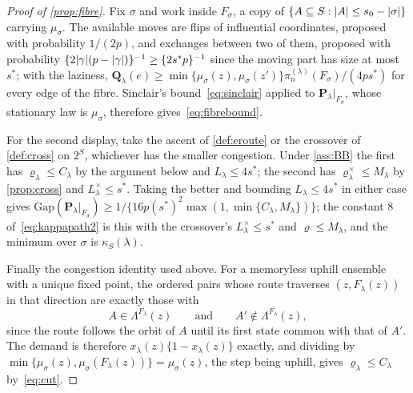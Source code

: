 \begin{proof}[Proof of \cref{prop:fibre}]
    Fix $\sigma$ and work inside $F_\sigma$, a copy of
    $\{A\subseteq S:\lvert A\rvert\leq s_0-\lvert\sigma\rvert\}$ carrying $\mu_\sigma$. The
    available moves are flips of influential coordinates, proposed with
    probability $1/(2p)$, and exchanges between two of them, proposed with
    probability $\{2\lvert\gamma\rvert(p-\lvert\gamma\rvert)\}^{-1}\geq\{2s^{\ast}p\}^{-1}$
    since the moving part has size at most $s^{\ast}$; with the laziness,
    $\mathbf{Q}_\lambda(e)\geq\min\{\mu_\sigma(z),\mu_\sigma(z')\}
    \pi_n^{(\lambda)}(F_\sigma)/(4ps^{\ast})$ for every edge of the fibre.
    Sinclair's bound~\eqref{eq:sinclair} applied to
    $\mathbf{P}_\lambda|_{F_\sigma}$, whose stationary law is $\mu_\sigma$,
    therefore gives~\eqref{eq:fibrebound}.

    For the second display, take the ascent of \cref{def:eroute} or the
    crossover of \cref{def:cross} on $2^{S}$, whichever has the smaller
    congestion. Under \cref{ass:BB} the first has
    $\varrho_\lambda\leq C_\lambda$ by the argument below and
    $L_\lambda\leq4s^{\ast}$; the second has
    $\varrho^{\times}_\lambda\leq M_\lambda$ by \cref{prop:cross} and
    $L^{\times}_\lambda\leq s^{\ast}$. Taking the better and bounding
    $L_\lambda\leq4s^{\ast}$ in either case gives
    $\mathrm{Gap}(\mathbf{P}_\lambda|_{F_\sigma})\geq1/\{16p(s^{\ast})^{2}
    \max(1,\min\{C_\lambda,M_\lambda\})\}$; the constant $8$
    of~\eqref{eq:kappapath2} is this with the crossover's
    $L^{\times}_\lambda\leq s^{\ast}$ and $\varrho\leq M_\lambda$, and the
    minimum over $\sigma$ is $\kappa_S(\lambda)$.

    Finally the congestion identity used above. For a memoryless uphill
    ensemble with a unique fixed point, the ordered pairs whose route
    traverses $(z,F_\lambda(z))$ in that direction are exactly those with
    \begin{equation}
        \label{eq:cutpairs}
        A\in\Lambda^{F_\lambda}(z)
        \qquad\text{and}\qquad
        A'\notin\Lambda^{F_\lambda}(z) ,
    \end{equation}
    since the route follows the orbit of $A$ until its first state common
    with that of $A'$. The demand is therefore
    $x_\lambda(z)\{1-x_\lambda(z)\}$ exactly, and dividing by
    $\min\{\mu_\sigma(z),\mu_\sigma(F_\lambda(z))\}=\mu_\sigma(z)$, the step
    being uphill, gives $\varrho_\lambda\leq C_\lambda$ by~\eqref{eq:cut}.
\end{proof}

